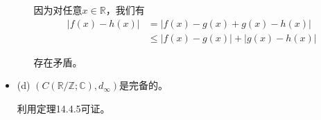 \documentclass{article}
\begin{document}
\begin{itemize}
\begin{itemize}
                因为对任意$x \in \mathbb{R}$，我们有
                \begin{align*}
                  |f(x) - h(x)| & = |f(x) - g(x) + g(x) - h(x)|      \\
                                & \leq |f(x) - g(x)| + |g(x) - h(x)|
                \end{align*}

                存在矛盾。

        \end{itemize}


  \item (d) $(C(\mathbb{R}/\mathbb{Z}; \mathbb{C}),d_{\infty})$是完备的。


        利用定理14.4.5可证。



\end{itemize}
\end{document}
